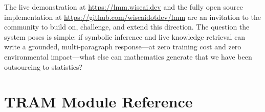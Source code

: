 \documentclass[11pt,a4paper]{article}
\begin{document}
The live demonstration at \url{https://lmm.wiseai.dev} and the fully open source
implementation at \url{https://github.com/wiseaidotdev/lmm} are an invitation to the
community to build on, challenge, and extend this direction. The question the system poses
is simple: if symbolic inference and live knowledge retrieval can write a grounded,
multi-paragraph response---at zero training cost and zero environmental impact---what else
can mathematics generate that we have been outsourcing to statistics?




\appendix

\section{TRAM Module Reference}
\label{app:modules}
\end{document}
